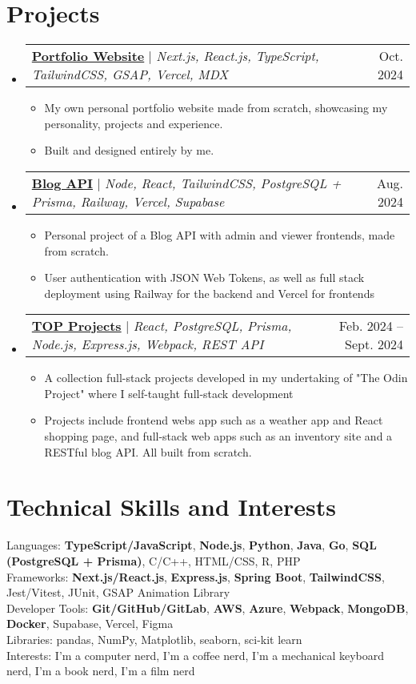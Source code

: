 \documentclass[letterpaper,11pt]{article}
\makeatletter
\newcommand{\resumeItem}[1]{
  \item\small{
    {#1 \vspace{-2pt}}
  }
}
\newcommand{\resumeProjectHeading}[2]{
    \item
    \begin{tabular*}{0.97\textwidth}{l@{\extracolsep{\fill}}r}
      \small#1 & #2 \\
    \end{tabular*}\vspace{-7pt}
}
\newcommand{\resumeSubHeadingListStart}{\begin{itemize}[leftmargin=0.15in, label={}]}
\newcommand{\resumeSubHeadingListEnd}{\end{itemize}}
\newcommand{\resumeItemListStart}{\begin{itemize}}
\newcommand{\resumeItemListEnd}{\end{itemize}\vspace{-5pt}}
\makeatother
\begin{document}
\section{Projects}
    \resumeSubHeadingListStart
      \resumeProjectHeading
        {\textbf{\href{https://edgr.live}{Portfolio Website}} $|$ \emph{Next.js, React.js, TypeScript, TailwindCSS, GSAP, Vercel, MDX}}{Oct. 2024}
          \resumeItemListStart
          \resumeItem{My own personal portfolio website made from scratch, showcasing my personality, projects and experience.}
          \resumeItem{Built and designed entirely by me.}
          \resumeItemListEnd
      \resumeProjectHeading
        {\textbf{\href{https://edgr-odin-blog-access.vercel.app/}{Blog API}} $|$ \emph{Node, React, TailwindCSS, PostgreSQL + Prisma, Railway, Vercel, Supabase}}{Aug. 2024}
          \resumeItemListStart
            \resumeItem{Personal project of a Blog API with admin and viewer frontends, made from scratch.}
            \resumeItem{User authentication with JSON Web Tokens, as well as full stack deployment using Railway for the backend and Vercel for frontends}
          \resumeItemListEnd
        \resumeProjectHeading
        {\textbf{\href{https://safarinexus.github.io/edgr-odinprojects/}{TOP Projects}} $|$ \emph{React, PostgreSQL, Prisma, Node.js, Express.js, Webpack, REST API}}{Feb. 2024 -- Sept. 2024}
          \resumeItemListStart
          \resumeItem{A collection full-stack projects developed in my undertaking of "The Odin Project" where I self-taught full-stack development}
          \resumeItem{Projects include frontend webs app such as a weather app and React shopping page, and full-stack web apps such as an inventory site and a RESTful blog API. All built from scratch.}
          \resumeItemListEnd
    \resumeSubHeadingListEnd


\section{Technical Skills and Interests}
 \begin{itemize}[leftmargin=0.15in, label={}]
    \small{\item{
      {Languages}{: \textbf{TypeScript/JavaScript}, \textbf{Node.js}, \textbf{Python}, \textbf{Java}, \textbf{Go}, \textbf{SQL (PostgreSQL + Prisma)}, C/C++, HTML/CSS, R, PHP} \\
      {Frameworks}{: \textbf{Next.js/React.js}, \textbf{Express.js}, \textbf{Spring Boot}, \textbf{TailwindCSS}, Jest/Vitest, JUnit, GSAP Animation Library} \\
      {Developer Tools}{: \textbf{Git/GitHub/GitLab}, \textbf{AWS}, \textbf{Azure}, \textbf{Webpack}, \textbf{MongoDB}, \textbf{Docker}, Supabase, Vercel, Figma} \\
      {Libraries}{: pandas, NumPy, Matplotlib, seaborn, sci-kit learn} \\
      {Interests}{: I’m a computer nerd, I’m a coffee nerd, I’m a mechanical keyboard nerd, I’m a book nerd, I’m a film nerd}
    }}
 \end{itemize}
\end{document}

